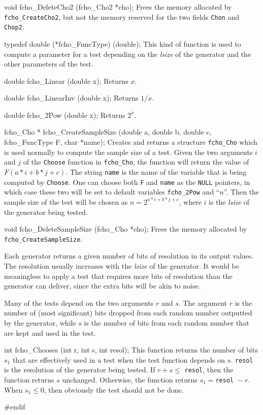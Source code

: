 void fcho_DeleteCho2 (fcho_Cho2 *cho);
\endcode
 \tab 
  Frees the memory allocated by {\tt fcho\_CreateCho2}, but not the memory
  reserved for the two fields {\tt Chon} and {\tt Chop2}.
 \endtab



\code

typedef double (*fcho_FuncType) (double);
\endcode
\tab
  This kind of function is used to compute a parameter for a test depending
  on the {\it lsize} of the generator and the other parameters of the test.
\endtab
\code


double fcho_Linear (double x);
\endcode
\tab
  Returns $x$.
\endtab
\code


double fcho_LinearInv (double x);
\endcode
\tab
   Returns $1/x$.
\endtab
\code


double fcho_2Pow (double x);
\endcode
\tab
   Returns $2^x$.
\endtab
\code


fcho_Cho * fcho_CreateSampleSize (double a, double b, double c,
                                  fcho_FuncType F, char *name);
\endcode
\tab Creates and returns a structure {\tt fcho\_Cho} which is used normally
  to compute the sample size of a test. Given the two arguments $i$ and $j$
  of the {\tt Choose} function in {\tt fcho\_Cho}, the function will return
  the value of $F(a*i + b*j + c)$. The string {\tt name} is the name of the
  variable that is being computed by {\tt Choose}. One can choose both
  {\tt F} and {\tt name} as the {\tt NULL} pointers, in which case these
  two will be set to
  default variables {\tt fcho\_2Pow} and ``$n$''. Then the sample size of the
  test will be chosen as $n = 2^{a*i + b*j + c}$, where $i$ is the  {\it lsize}
  of the generator being tested.
\endtab
\code


void fcho_DeleteSampleSize (fcho_Cho *cho);
\endcode
\tab Frees the memory allocated by {\tt fcho\_CreateSampleSize}.
\endtab



Each generator returns a given number of bits of resolution in its output
values. The resolution usually increases with the {\it lsize} of the generator.
It would be meaningless to apply a test that requires
more bits of resolution than the generator can deliver, since the extra
bits will be akin to noise.

 Many of the tests depend on the two arguments $r$ and $s$. The argument
 $r$ is the number of (most significant) bits dropped from each
random number outputted by the generator, while $s$ is the number of bits
from each random number that are kept and used in the test.

\code


int fcho_Chooses (int r, int s, int resol);
\endcode
\tab This function returns the number of bits $s_1$ that are effectively used
in a test when the test function depends on $s$. {\tt resol} is the 
resolution of the generator being tested. If $r+s \le {}$ {\tt resol}, then
the function returns $s$ unchanged. Otherwise, the function returns
$s_1 = {}${\tt resol} ${} -r$. When $s_1 \le 0$, then obviously the test
should not be done.
\endtab

\code
\hide
#endif
\endhide
\endcode
